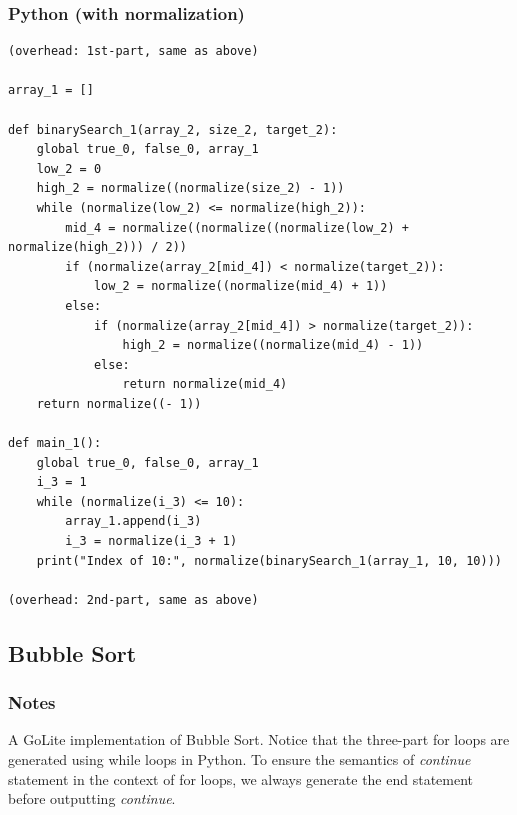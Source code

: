 \documentclass{article}
\begin{document}
\subsubsection{Python (with normalization)}
\begin{lstlisting}
(overhead: 1st-part, same as above)

array_1 = []

def binarySearch_1(array_2, size_2, target_2):
	global true_0, false_0, array_1
	low_2 = 0
	high_2 = normalize((normalize(size_2) - 1))
	while (normalize(low_2) <= normalize(high_2)):
		mid_4 = normalize((normalize((normalize(low_2) + normalize(high_2))) / 2))
		if (normalize(array_2[mid_4]) < normalize(target_2)):
			low_2 = normalize((normalize(mid_4) + 1))
		else:
			if (normalize(array_2[mid_4]) > normalize(target_2)):
				high_2 = normalize((normalize(mid_4) - 1))
			else:
				return normalize(mid_4)
	return normalize((- 1))

def main_1():
	global true_0, false_0, array_1
	i_3 = 1
	while (normalize(i_3) <= 10):
		array_1.append(i_3)
		i_3 = normalize(i_3 + 1)
	print("Index of 10:", normalize(binarySearch_1(array_1, 10, 10)))

(overhead: 2nd-part, same as above)
\end{lstlisting}

\subsection{Bubble Sort}
\subsubsection{Notes}
A GoLite implementation of Bubble Sort. Notice that the three-part for
loops are generated using while loops in Python. To ensure the semantics
of \textit{continue} statement in the context of for loops, we always
generate the end statement before outputting \textit{continue}.
\end{document}
